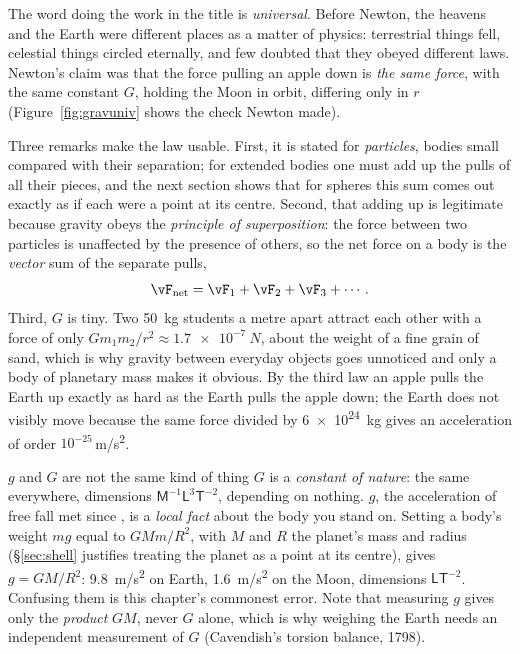 The word doing the work in the title is \emph{universal}. Before Newton, the heavens and the Earth were
different places as a matter of physics: terrestrial things fell, celestial things circled eternally,
and few doubted that they obeyed different laws. Newton's claim was that the force pulling an apple down is
\emph{the same force}, with the same constant $G$, holding the Moon in orbit, differing only in $r$
(Figure~\ref{fig:gravuniv} shows the check Newton made).

Three remarks make the law usable. First, it is stated for \emph{particles}, bodies small compared with
their separation; for extended bodies one must add up the pulls of all their pieces, and the next section
shows that for spheres this sum comes out exactly as if each were a point at its centre. Second, that
adding up is legitimate because gravity obeys the \emph{principle of superposition}: the force between
two particles is unaffected by the presence of others, so the net force on a body is the \emph{vector}
sum of the separate pulls,
\[
\vF_{\text{net}}=\vF_1+\vF_2+\vF_3+\cdots .
\]
Third, $G$ is tiny. Two \SI{50}{kg} students a metre apart attract each other with a force
of only $Gm_1m_2/r^2\approx\SI{1.7e-7}{N}$, about the weight of a fine grain of
sand, which is
why gravity between everyday objects goes unnoticed and only a body of planetary mass makes it obvious.
By the third law an apple pulls the Earth up exactly as hard as the Earth pulls the apple
down; the Earth does not visibly move because the same force divided by \SI{6e24}{kg} gives an
acceleration of order $10^{-25}$\,\si{m/s^2}.

\begin{figure}[htbp]
\centering
{}
\end{figure}

\begin{trapbox}{$g$ and $G$ are not the same kind of thing}
$G$ is a \emph{constant of nature}: the same everywhere, dimensions $\mathsf M^{-1}\mathsf L^3\mathsf T^{-2}$,
depending on nothing. $g$, the acceleration of free fall met since , is a
\emph{local fact} about the body you stand on. Setting a body's weight $mg$ equal to $GMm/R^2$, with $M$
and $R$ the planet's mass and radius (\S\ref{sec:shell} justifies treating the planet as a point at its
centre), gives $g=GM/R^2$: \SI{9.8}{m/s^2} on
Earth, \SI{1.6}{m/s^2} on the Moon, dimensions $\mathsf L\mathsf T^{-2}$. Confusing them is this chapter's
commonest error. Note that measuring $g$ gives only the \emph{product} $GM$, never $G$ alone, which is
why weighing the Earth needs an independent measurement of $G$ (Cavendish's torsion balance, 1798).
\end{trapbox}

